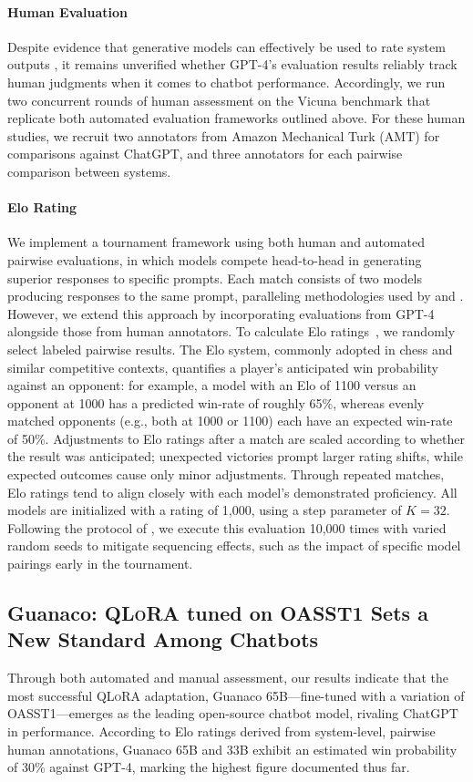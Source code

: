 \paragraph{Human Evaluation} Despite evidence that generative models can effectively be used to rate system outputs \citep{fu2023gptscore}, it remains unverified whether GPT-4’s evaluation results reliably track human judgments when it comes to chatbot performance. Accordingly, we run two concurrent rounds of human assessment on the Vicuna benchmark that replicate both automated evaluation frameworks outlined above. For these human studies, we recruit two annotators from Amazon Mechanical Turk (AMT) for comparisons against ChatGPT, and three annotators for each pairwise comparison between systems.

\paragraph{Elo Rating} We implement a tournament framework using both human and automated pairwise evaluations, in which models compete head-to-head in generating superior responses to specific prompts. Each match consists of two models producing responses to the same prompt, paralleling methodologies used by \citet{bai2022training} and \citet{vicuna2023}. However, we extend this approach by incorporating evaluations from GPT-4 alongside those from human annotators. To calculate Elo ratings~\citep{elo1967proposed,elo1978rating}, we randomly select labeled pairwise results. The Elo system, commonly adopted in chess and similar competitive contexts, quantifies a player's anticipated win probability against an opponent: for example, a model with an Elo of 1100 versus an opponent at 1000 has a predicted win-rate of roughly 65\%, whereas evenly matched opponents (e.g., both at 1000 or 1100) each have an expected win-rate of 50\%. Adjustments to Elo ratings after a match are scaled according to whether the result was anticipated; unexpected victories prompt larger rating shifts, while expected outcomes cause only minor adjustments. Through repeated matches, Elo ratings tend to align closely with each model's demonstrated proficiency. All models are initialized with a rating of 1,000, using a step parameter of $K=32$. Following the protocol of \citet{vicuna2023}, we execute this evaluation 10,000 times with varied random seeds to mitigate sequencing effects, such as the impact of specific model pairings early in the tournament.

\subsection{\textbf{Guanaco}: \textsc{QLoRA} tuned on OASST1 Sets a New Standard Among Chatbots} Through both automated and manual assessment, our results indicate that the most successful \textsc{QLoRA} adaptation, {Guanaco} 65B—fine-tuned with a variation of OASST1—emerges as the leading open-source chatbot model, rivaling ChatGPT in performance. According to Elo ratings derived from system-level, pairwise human annotations, {Guanaco} 65B and 33B exhibit an estimated win probability of 30\% against GPT-4, marking the highest figure documented thus far.


